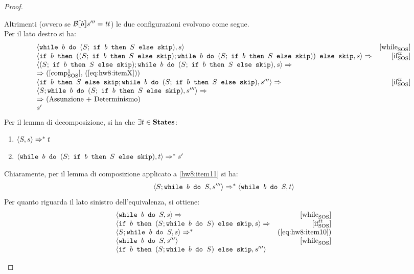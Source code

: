 \begin{proof}
\begin{itemize}
  Altrimenti (ovvero se $\B{b}''' = \semtrue$) le due configurazioni evolvono
  come segue. \\
  Per il lato destro si ha:
  $$
  \begin{array}{lr}
  \confSs{\wbS{b}{(S;\ \ifABC{b}{S}{\skipForFriends})}}{s} & \whileSOS \\
  \confSs{\ifABC{b}
            {((S;\ \ifABC{b}{S}{\skipForFriends});
              \wbS{b}{(S;\ \ifABC{b}{S}{\skipForFriends})})}
            {\skipForFriends}
         }{s} \Rar{ }& \ifttSOS \\
  \confSs{  (S;\ \ifABC{b}{S}{\skipForFriends});
            \wbS{b}{(S;\ \ifABC{b}{S}{\skipForFriends})}
         }{s} \Rar{ } \\
  \Rar{ } (\text{$\compoSOS$, (\ref{eq:hw8:itemX})})\\
  \confSs{  \ifABC{b}{S}{\skipForFriends};
            \wbS{b}{(S;\ \ifABC{b}{S}{\skipForFriends})}
         }{s'''} \Rar{ } & \ifttSOS \\
  \confSs{  S;
            \wbS{b}{(S;\ \ifABC{b}{S}{\skipForFriends})}
         }{s'''} \Rar{ } \\
  \Rar{ } (\text{Assunzione + Determinismo})\\
  s'
  \end{array}
  $$
  Per il lemma di decomposizione, si ha che $\exists{t}\in\states$:
  \begin{enumerate}[label=(\alph*)]
    \item $\confSs{S}{s} \Rar{*} t$
    \label{hw8:item11}
    \item $\confSs{\wbS{b}{(S;\ \ifABC{b}{S}{\skipForFriends})}}{t} \Rar{*} s'$
    \label{hw8:item12}
  \end{enumerate}
  Chiaramente, per il lemma di composizione applicato a \ref{hw8:item11} si ha:
  \begin{equation}
  \langle{}S; \mbox{\normalfont{\texttt{while }}} b \textrm{\normalfont{\texttt{ do }}} S, s'''\rangle{} \Rightarrow^{*} \langle{}\mbox{\normalfont{\texttt{while }}} b \textrm{\normalfont{\texttt{ do }}} S, t\rangle{}
  \label{eq:hw8:item13}
  \end{equation}
  Per quanto riguarda il lato sinistro dell'equivalenza, si ottiene:
  $$
  \begin{array}{lr}
  \confSs{\wbS{b}{S}}{s} \Rar{ }  & \whileSOS \\
  \confSs{\ifABC{b}{(S;\wbS{b}{S})}{\skipForFriends}}{s} \Rar{ } & \ifttSOS\\
  \confSs{S; \wbS{b}{S}}{s} \Rar{*} & (\text{\ref{eq:hw8:item10}})\\
  \confSs{\wbS{b}{S}}{s'''}  & \whileSOS \\
  \confSs{\ifABC{b}{(S;\wbS{b}{S})}{\skipForFriends}}{s'''}

\end{array}$$
\end{itemize}
\end{proof}
